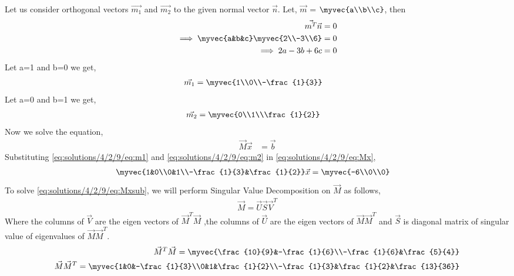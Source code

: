 Let us consider orthogonal vectors $\vec{m_1}$ and $\vec{m_2}$ to the given normal vector $\vec{n}$. Let, $\vec{m}$ = $\myvec{a\\b\\c}$, then
\begin{align}
\vec{m^T}\vec{n} &= 0\\
\implies\myvec{a&b&c}\myvec{2\\-3\\6} &= 0\\
\implies2a-3b+6c &= 0
\end{align}
Let a=1 and b=0 we get,
\begin{align}
\vec{m_1} &= \myvec{1\\0\\-\frac{1}{3}} \label{eq:solutions/4/2/9/eq:m1}
\end{align}
Let a=0 and b=1 we get,
\begin{align}
\vec{m_2} &= \myvec{0\\1\\\frac{1}{2}} \label{eq:solutions/4/2/9/eq:m2}
\end{align}
Now we solve the equation,
\begin{align}
\vec{M}\vec{x} &= \vec{b}\label{eq:solutions/4/2/9/eq:Mx}
\end{align}
Substituting \eqref{eq:solutions/4/2/9/eq:m1} and \eqref{eq:solutions/4/2/9/eq:m2} in \eqref{eq:solutions/4/2/9/eq:Mx},
\begin{align}
    \myvec{1&0\\0&1\\-\frac{1}{3}&\frac{1}{2}}\vec{x} &= \myvec{-6\\0\\0}\label{eq:solutions/4/2/9/eq:Mxsub}
\end{align}
To solve \eqref{eq:solutions/4/2/9/eq:Mxsub}, we will perform Singular Value Decomposition on $\vec{M}$ as follows,
\begin{align}
\vec{M}=\vec{U}\vec{S}\vec{V}^T\label{eq:solutions/4/2/9/eq:SVD}
\end{align}
Where the columns of $\vec{V}$ are the eigen vectors of $\vec{M}^T\vec{M}$ ,the columns of $\vec{U}$ are the eigen vectors of $\vec{M}\vec{M}^T$ and $\vec{S}$ is diagonal matrix of singular value of eigenvalues of $\vec{M}\vec{M}^T$.
\begin{align}
\vec{M}^T\vec{M}=\myvec{\frac{10}{9}&-\frac{1}{6}\\-\frac{1}{6}&\frac{5}{4}}\label{eq:solutions/4/2/9/eq:MtM}\\
\vec{M}\vec{M}^T=\myvec{1&0&-\frac{1}{3}\\0&1&\frac{1}{2}\\-\frac{1}{3}&\frac{1}{2}&\frac{13}{36}}
\end{align}
